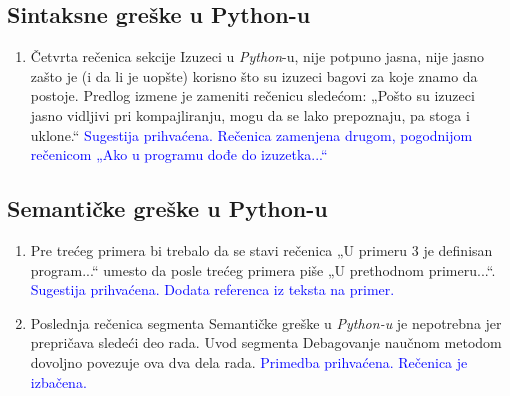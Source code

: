 \documentclass[a4paper]{report}
\newcommand{\odgovor}[1]{\textcolor{blue}{#1}}
\begin{document}
\subsection{Sintaksne greške u Python-u}
\begin{enumerate}
    \item Četvrta rečenica sekcije Izuzeci u \emph{Python}-u, nije potpuno jasna, nije jasno zašto je (i da li je uopšte) korisno što su izuzeci bagovi za koje znamo da postoje. Predlog izmene je zameniti rečenicu sledećom:
    „Pošto su izuzeci jasno vidljivi pri kompajliranju, mogu da se lako prepoznaju, pa stoga i uklone.“
    \odgovor{Sugestija prihvaćena. Rečenica zamenjena drugom, pogodnijom rečenicom „Ako u programu dođe do izuzetka...“}
\end{enumerate}
\subsection{Semantičke greške u Python-u}
\begin{enumerate}
    \item Pre trećeg primera bi trebalo da se stavi rečenica „U primeru 3 je definisan program...“ umesto da posle trećeg primera piše „U prethodnom primeru...“.
    \odgovor{Sugestija prihvaćena. Dodata referenca iz teksta na primer.}
    \item Poslednja rečenica segmenta Semantičke greške u \emph{Python-u} je nepotrebna jer prepričava sledeći deo rada. Uvod segmenta Debagovanje naučnom metodom dovoljno povezuje ova dva dela rada.
    \odgovor{Primedba prihvaćena. Rečenica je izbačena.}
\end{enumerate}
\end{document}

